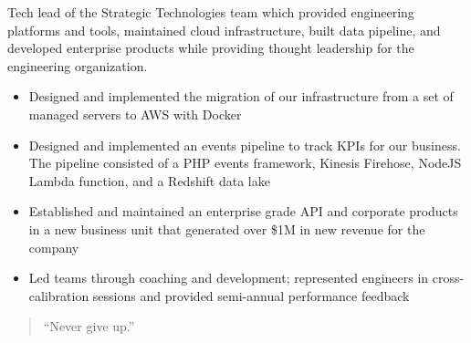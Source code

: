 \documentclass[10pt,a4paper,ragged2e,withhyper]{altacv}
\begin{document}
\begin{paracol}{2}
Tech lead of the Strategic Technologies team which provided engineering platforms and tools, maintained cloud infrastructure, built data pipeline, and developed enterprise products while providing thought leadership for the engineering organization.
\begin{itemize}
\item Designed and implemented the migration of our infrastructure from a set of managed servers to AWS with Docker
\item Designed and implemented an events pipeline to track KPIs for our business. The pipeline consisted of a PHP events framework, Kinesis Firehose, NodeJS Lambda function, and a Redshift data lake
\item Established and maintained an enterprise grade API and corporate products in a new business unit that generated over \$1M in new revenue for the company
\item Led teams through coaching and development; represented engineers in cross-calibration sessions and provided semi-annual performance feedback
\end{itemize}


\divider{}



\divider{}


\switchcolumn

\begin{quote}
``Never give up.''
\end{quote}






\end{paracol}
\end{document}
